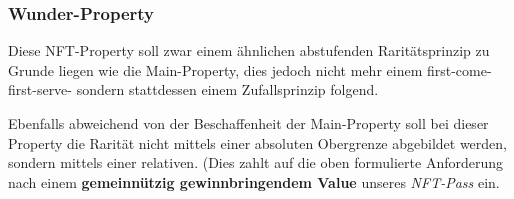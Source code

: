 
\subsubsection{Wunder-Property}

\vspace{0.3cm}

Diese NFT-Property soll zwar einem ähnlichen abstufenden Raritätsprinzip zu Grunde liegen wie die Main-Property, dies jedoch nicht mehr einem first-come-first-serve- sondern stattdessen einem Zufallsprinzip folgend.

Ebenfalls abweichend von der Beschaffenheit der Main-Property soll bei dieser Pro\-perty die Rarität nicht mittels einer absoluten Obergrenze abgebildet werden, sondern mittels einer relativen. (Dies zahlt auf die oben formulierte Anforderung nach einem \textbf{gemeinnützig gewinnbringendem Value} unseres \textit{NFT-Pass} ein.

\vspace{0.3cm}

